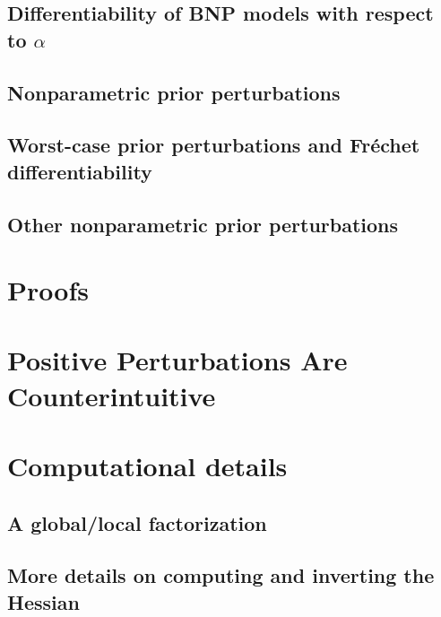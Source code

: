 \documentclass[ba]{imsart}
\begin{document}
    \subsection{Differentiability of BNP models with respect to $\alpha$}
    

    \subsection{Nonparametric prior perturbations}
    

    \subsection{Worst-case prior perturbations and Fr{\'e}chet differentiability}
    

    \subsection{Other nonparametric prior perturbations}
    

\section{Proofs}


\section{Positive Perturbations Are Counterintuitive}


\section{Computational details}

\subsection{A global/local factorization}


\subsection{More details on computing and inverting the Hessian}

\end{document}
